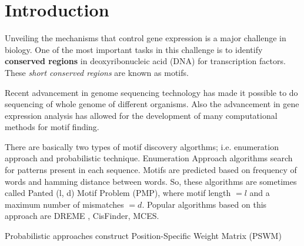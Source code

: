 \section{Introduction}
\label{sec:intro}
Unveiling the mechanisms that control gene expression is a major challenge in biology. One of the most important tasks in this challenge is to identify \textbf{conserved regions} in deoxyribonucleic acid (DNA) for transcription factors. These \textit{short conserved regions} are known as motifs.

Recent advancement in genome sequencing technology has made it possible to do sequencing of whole genome of different organisms. Also the advancement in gene expression analysis has allowed for the development of many computational methods for motif finding.

There are basically two types of motif discovery algorthms; i.e. enumeration approach and probabilistic technique\cite{hashim2019review}. Enumeration Approach algorithms search for patterns present in each sequence. Motifs are predicted based on frequency of words and hamming distance between words. So, these algorithms are sometimes called Panted (l, d) Motif Problem (PMP), where motif length $= l$ and a maximum number of mismatches $= d$. Popular algorithms based on this approach are DREME \cite{karaboga2016discrete}, CisFinder\cite{bailey2011dreme}, MCES\cite{jia2014new}.

Probabilistic approaches construct Position-Specific Weight Matrix (PSWM)

